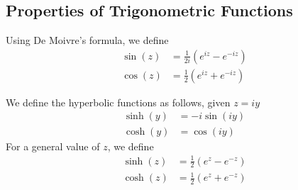 \documentclass[../mmf.tex]{subfiles}
\begin{document}
\subsection{Properties of Trigonometric Functions}
\begin{dfn}
	Using De Moivre's formula, we define
	\begin{equation}
		\begin{aligned}
			\sin(z)&=\frac{1}{2i}\left( e^{iz}-e^{-iz} \right)\\
			\cos(z)&=\frac{1}{2}\left( e^{iz}+e^{-iz} \right)
		\end{aligned}
		\label{eq:trigcompfunc}
	\end{equation}
\end{dfn}
\begin{dfn}
	We define the hyperbolic functions as follows, given $z=iy$
	\begin{equation}
		\begin{aligned}
			\sinh(y)&=-i\sin(iy)\\
			\cosh(y)&=\cos(iy)
		\end{aligned}
		\label{eq:hyperbolic}
	\end{equation}
	For a general value of $z$, we define
	\begin{equation}
		\begin{aligned}
			\sinh(z)&=\frac{1}{2}\left( e^z-e^{-z} \right)\\
			\cosh(z)&=\frac{1}{2}\left( e^{z}+e^{-z} \right)
		\end{aligned}
		\label{eq:exphyperbolic}
	\end{equation}
\end{dfn}
\end{document}
